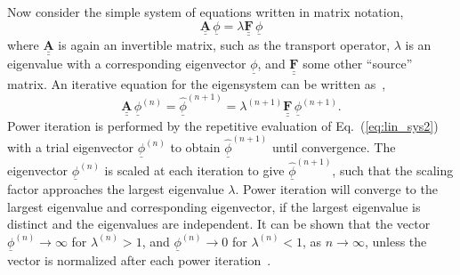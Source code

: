 \noindent
	\indent Now consider the simple system of equations written in matrix notation,
	\begin{equation}
		\underline{\underline{\mathbf{A}}}\, \underline{\phi}=\lambda
		\underline{\underline{\mathbf{F}}} \, \underline{\phi}
	\end{equation}
	where ${\underline{\underline{\mathbf{A}}}}$ is again an invertible matrix,
	such as the transport operator, ${\lambda}$ is an eigenvalue with a corresponding
	eigenvector ${\underline{\phi}}$, and ${\underline{\underline{\mathbf{F}}}}$ some other 
	``source'' matrix.  An iterative equation for the eigensystem can be written 
	as~\cite{Hof:01},
	\begin{equation}
		\underline{\underline{\mathbf{A}}}\, {\underline{\phi}}^{\left({n}\right)}=
		{\underline{{\hat{\phi}}}^{\left({n+1}\right)}}=
		{\lambda}^{\left({n+1}\right)}\underline{\underline{\mathbf{F}}} \,
		{\underline{\phi}}^{\left({n+1}\right)}.
	\label{eq:lin_sys2}
	\end{equation}
	Power iteration is performed by the repetitive evaluation of Eq.~(\ref{eq:lin_sys2}) with
	a trial eigenvector ${\underline{\phi}}^{\left({n}\right)}$ to obtain
	${\underline{{\hat{\phi}}}^{\left({n+1}\right)}}$ until convergence.  The eigenvector
	${\underline{\phi}}^{\left({n}\right)}$ is scaled at each iteration to give 
	${\underline{{\hat{\phi}}}^{\left({n+1}\right)}}$, such that the scaling factor 
	approaches the largest eigenvalue ${\lambda}$.  Power iteration will converge to the
	largest eigenvalue and corresponding eigenvector, if the largest eigenvalue is distinct
	and the eigenvalues are independent.  It can be shown that the vector
	${{\underline{\phi}}^{\left({n}\right)}\rightarrow \infty}$ for 
	${{\lambda}^{\left({n}\right)}>1}$, and ${{\underline{\phi}}^{\left({n}\right)}\rightarrow 0}$
	for ${{\lambda}^{\left({n}\right)}<1}$, as ${{n}\rightarrow \infty}$, unless the vector
	is normalized after each power iteration~\cite{Hof:01}.
	
